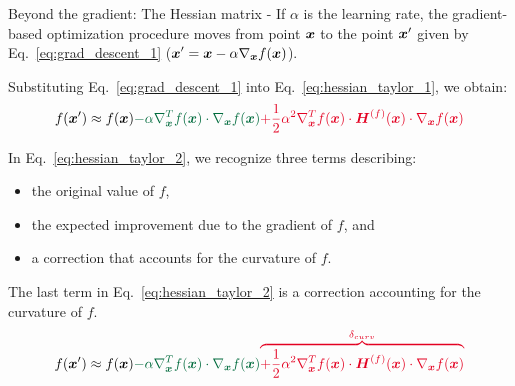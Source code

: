 \begin{frame}[t,allowframebreaks]{
    Beyond the gradient: The Hessian matrix -}
    If $\alpha$ is the \gls{learning rate}, 
    the gradient-based optimization procedure moves from point $\boldsymbol{x}$ 
    to the point $\boldsymbol{x}^\prime$ given by Eq.~\ref{eq:grad_descent_1}
    ($\displaystyle \boldsymbol{x}^\prime = \boldsymbol{x} - \alpha \nabla_{\boldsymbol{x}}f(\boldsymbol{x})$).\\
    \vspace{0.2cm}

    Substituting Eq.~\ref{eq:grad_descent_1} into Eq.~\ref{eq:hessian_taylor_1}, 
    we obtain:
    \vspace{-0.1cm}
    \begin{equation}
        f(\vect{x}^\prime) \approx 
        f(\vect{x}) 
        {\color{cadmiumgreen}
          - \alpha 
           \nabla_{\vect{x}}^{T}f(\vect{x}) \cdot 
           \nabla_{\vect{x}}f(\vect{x})      
        } 
        {\color{cadmiumred}      
           + \frac{1}{2} \alpha^2 
           \nabla_{\vect{x}}^{T}f(\vect{x}) \cdot 
           \vect{H}^{(f)}(\vect{x}) \cdot 
           \nabla_{\vect{x}}f(\vect{x})
        } 
        \label{eq:hessian_taylor_2}
    \end{equation}

    In Eq.~\ref{eq:hessian_taylor_2}, we recognize three terms describing:\\
    \begin{itemize}
        \item the original value of $f$,
        \item the {\color{cadmiumgreen}expected improvement due to the gradient of $f$}, and
        \item a {\color{cadmiumred}correction that accounts for the curvature of $f$}.
    \end{itemize}

    \framebreak


    The last term in Eq.~\ref{eq:hessian_taylor_2} is a
    {\color{cadmiumred}correction accounting for the curvature of $f$}.\\
    \vspace{-0.5cm}
    \begin{equation*}
        f(\vect{x}^\prime) \approx 
        f(\vect{x}) 
        {\color{cadmiumgreen}
          - \alpha 
           \nabla_{\vect{x}}^{T}f(\vect{x}) \cdot 
           \nabla_{\vect{x}}f(\vect{x})      
        } 
        {\color{cadmiumred}    
         \overbrace{  
           + \frac{1}{2} \alpha^2 
           \nabla_{\vect{x}}^{T}f(\vect{x}) \cdot 
           \vect{H}^{(f)}(\vect{x}) \cdot 
           \nabla_{\vect{x}}f(\vect{x})
         }^\text{$\delta_{curv}$}
        } 
    \end{equation*}


\end{frame}
